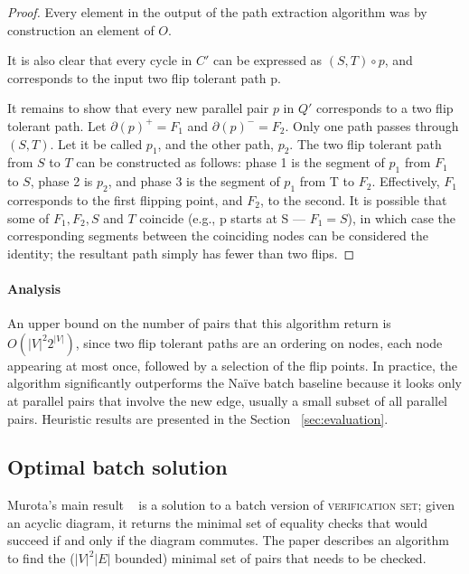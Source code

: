 \documentclass[sigplan,review,anonymous]{acmart}
\begin{document}
\begin{proof}
    Every element in the output of the path extraction algorithm was by construction an element of $O$.

    It is also clear that every cycle in $C'$ can be expressed as $(S, T) \circ p$, and corresponds to the input two flip tolerant path p.
    
    It remains to show that every new parallel pair $p$ in $Q'$ corresponds to a two flip tolerant path.
    Let $\partial(p)^+ = F_1$ and $\partial(p)^- = F_2$. 
    Only one path passes through $(S, T)$. Let it be called $p_1$, and the other path, $p_2$.
    The two flip tolerant path from $S$ to $T$ can be constructed as follows: phase 1 is the segment of $p_1$ from $F_1$ to $S$, phase 2 is $p_2$, and phase 3 is the segment of $p_1$ from T to $F_2$.
    Effectively, $F_1$ corresponds to the first flipping point, and $F_2$, to the second.
    It is possible that some of $F_1, F_2, S$ and $T$ coincide (e.g., p starts at S --- $F_1 = S$), in which case the corresponding segments between the coinciding nodes can be considered the identity; the resultant path simply has fewer than two flips.        
\end{proof}

\paragraph{Analysis}
An upper bound on the number of pairs that this algorithm return is $O(|V|^{2} 2^{|V|})$, since two flip tolerant paths are an ordering on nodes, each node appearing at most once, followed by a selection of the flip points.
In practice, the algorithm significantly outperforms the Na\"{i}ve batch baseline because it looks only at parallel pairs that involve the new edge, usually a small subset of all parallel pairs.
Heuristic results are presented in the Section ~\ref{sec:evaluation}.

\subsection{Optimal batch solution}
Murota's main result ~\cite{commutative} is a solution to a batch version of \textsc{verification set}; given an acyclic diagram, it returns the minimal set of equality checks that would succeed if and only if the diagram commutes.
The paper describes an algorithm to find the ($|V|^2|E|$ bounded) minimal set of pairs that needs to be checked.

\end{document}
